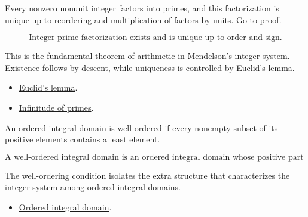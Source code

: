 \begin{theorem}
\label{thm:men-unique-prime-factorization}
Every nonzero nonunit integer factors into primes, and this factorization is
unique up to reordering and multiplication of factors by units.
\hyperref[prf:men-unique-prime-factorization]{Go to proof.}
\end{theorem}

\begin{remark*}
\[
  \text{Integer prime factorization exists and is unique up to order and sign.}
\]
\end{remark*}

\begin{remark*}[Interpretation]
This is the fundamental theorem of arithmetic in Mendelson's integer system.
Existence follows by descent, while uniqueness is controlled by Euclid's
lemma.
\end{remark*}

\begin{dependencies}
\begin{itemize}
  \item \hyperref[thm:men-euclid-lemma]{Euclid's lemma}.
  \item \hyperref[thm:men-infinitude-of-primes]{Infinitude of primes}.
\end{itemize}
\end{dependencies}

\begin{definition}
\label{def:men-well-ordered-integral-domain}
An ordered integral domain is well-ordered if every nonempty subset of its
positive elements contains a least element.
\end{definition}

\begin{remark*}
\[
  \text{A well-ordered integral domain is an ordered integral domain whose
  positive part is well ordered.}
\]
\end{remark*}

\begin{remark*}[Interpretation]
The well-ordering condition isolates the extra structure that characterizes
the integer system among ordered integral domains.
\end{remark*}

\begin{dependencies}
\begin{itemize}
  \item \hyperref[def:men-ordered-integral-domain]{Ordered integral domain}.
\end{itemize}
\end{dependencies}


